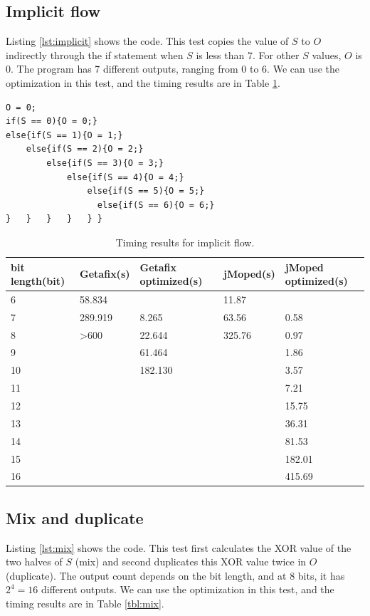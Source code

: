 \subsection{Implicit flow}
Listing \ref{lst:implicit} shows the code. This test copies the value of $S$ to $O$ indirectly through the if statement when $S$ is less than $7$. For other $S$ values, $O$ is $0$. The program has 7 different outputs, ranging from $0$ to $6$. We can use the optimization in this test, and the timing results are in Table \ref{tbl:implicit}.

\lstset{language=C}  
\begin{lstlisting}[float=!h, caption={Implict flow test program.},label=lst:implicit]
O = 0;
if(S == 0){O = 0;}
else{if(S == 1){O = 1;}
	else{if(S == 2){O = 2;}
		else{if(S == 3){O = 3;}
			else{if(S == 4){O = 4;}
				else{if(S == 5){O = 5;}
				  else{if(S == 6){O = 6;}
}	}	}	} 	} }
\end{lstlisting}

\begin{table}[!h]
\begin{center}
\begin{tabular}{|l|l|l|l|l|}
\hline
bit length(bit) & Getafix(s) & Getafix optimized(s) & jMoped(s) & jMoped optimized(s) \\ \hline
6 & 58.834 &  & 11.87 &  \\ \hline
7 & 289.919 & 8.265 & 63.56 & 0.58 \\ \hline
8 & \textgreater600 & 22.644 & 325.76 & 0.97 \\ \hline
9 &  & 61.464 &  & 1.86 \\ \hline
10 &  & 182.130 &  & 3.57 \\ \hline
11 &  &  &  & 7.21 \\ \hline
12 &  &  &  & 15.75 \\ \hline
13 &  &  &  & 36.31 \\ \hline
14 &  &  &  & 81.53 \\ \hline
15 &  &  &  & 182.01 \\ \hline
16 &  &  &  & 415.69 \\ \hline
\end{tabular}
\end{center}
\caption{Timing results for implicit flow.}
\label{tbl:implicit}
\end{table}

\subsection{Mix and duplicate}
Listing \ref{lst:mix} shows the code. This test first calculates the XOR value of the two halves of $S$ (mix) and second duplicates this XOR value twice in $O$ (duplicate). The output count depends on the bit length, and at $8$ bits, it has $2^{4} = 16$ different outputs. We can use the optimization in this test, and the timing results are in Table \ref{tbl:mix}.

